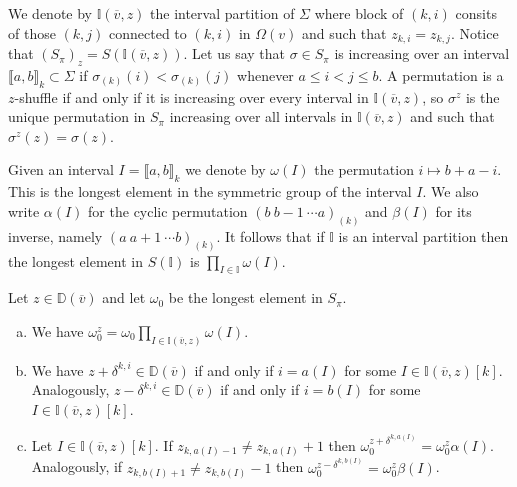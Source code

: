 \documentclass[11pt,fleqn]{amsart}
\newcommand\vv{\overline{v}}
\newcommand\II{\mathbb I}
\newcommand\interval[1]{\llbracket #1 \rrbracket}
\newcommand\DD{\mathbb D}
\begin{document}
We denote by $\II(\vv,z)$ the interval partition of $\Sigma$ where block of
$(k,i)$ consits of those $(k,j)$ connected to $(k,i)$ in $\Omega(v)$ and such
that $z_{k,i} = z_{k,j}$. Notice that $(S_\pi)_z = S(\II(\vv, z))$. Let 
us say that $\sigma \in S_\pi$ is increasing over an interval 
$\interval{a,b}_k \subset \Sigma$ if $\sigma_{(k)}(i) < \sigma_{(k)}(j)$ 
whenever $a \leq i < j \leq b$. A permutation is a $z$-shuffle if and only if 
it is increasing over every interval in $\II(\vv, z)$, so $\sigma^z$ is the 
unique permutation in $S_\pi$ increasing over all intervals in $\II(\vv, z)$ 
and such that $\sigma^z(z) = \sigma(z)$.

Given an interval $I = \interval{a,b}_k$ we denote by $\omega(I)$ the 
permutation $i \mapsto  b+a-i$. This is the longest element in the symmetric
group of the interval $I$. We also write $\alpha(I)$ for the cyclic 
permutation $(b \ b-1 \ \cdots a)_{(k)}$ and $\beta(I)$ for its inverse, 
namely $(a \ a+1 \ \cdots b)_{(k)}$. It follows that if $\II$ is an interval 
partition then the longest element in $S(\II)$ is $\prod_{I\in\II} \omega(I)$.
\begin{Lemma}
\label{L:omega-delta}
Let $z\in \DD(\vv)$ and let $\omega_0$ be the longest element in $S_\pi$.
\begin{enumerate}[(a)]
\item 
\label{i:omega-z}
We have $\omega_0^z = \omega_0 \prod_{I \in \II(\vv, z)} \omega(I)$.

\item 
\label{i:D-delta}
We have $z + \delta^{k,i} \in \DD(\vv)$ if and only if $i = a(I)$ for some $I 
	\in \II(\vv,z)[k]$. Analogously, $z - \delta^{k,i} \in \DD(\vv)$ if and 
	only if $i = b(I)$ for some $I \in \II(\vv,z)[k]$.

\item 
\label{i:omega-delta}
Let $I \in \II(\vv,z)[k]$. If $z_{k,a(I)-1} \neq z_{k,a(I)} + 1$ then 
	$\omega_0^{z + \delta^{k,a(I)}} = \omega_0^z \alpha(I)$. Analogously,
	if $z_{k,b(I)+1} \neq z_{k,b(I)} - 1$ then $\omega_0^{z - \delta^{k,b(I)}} 
	= \omega_0^z \beta(I)$.
\end{enumerate}
\end{Lemma}
\end{document}
